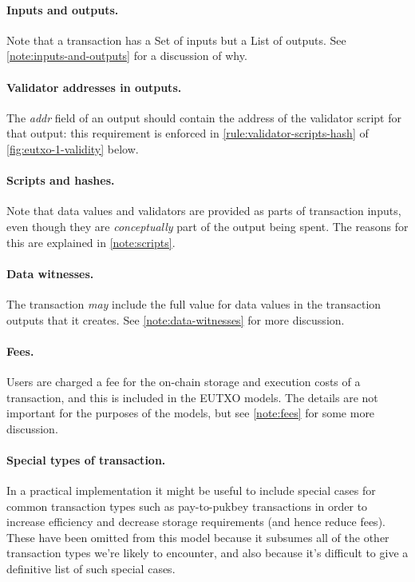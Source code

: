 \documentclass[a4paper]{article}
\newcounter{note}
\begin{document}
\paragraph{Inputs and outputs.} Note that a transaction has a
\textsf{Set} of inputs but a \textsf{List} of outputs. See
\cref{note:inputs-and-outputs} for a discussion of why.

\paragraph{Validator addresses in outputs.} The \textit{addr} field
of an output should contain the address of the validator script for
that output: this requirement is enforced in
\cref{rule:validator-scripts-hash} of
\cref{fig:eutxo-1-validity} below.

\paragraph{Scripts and hashes.} Note that data values and validators are
provided as parts of transaction inputs, even though they are
\emph{conceptually} part of the output being spent.
The reasons for this are explained in \cref{note:scripts}.

\paragraph{Data witnesses.} The transaction \emph{may} include the full
value for data values in the transaction outputs that it creates.
See \cref{note:data-witnesses} for more discussion.

\paragraph{Fees.}  Users are charged a fee for the on-chain storage
and execution costs of a transaction, and this is included in the
EUTXO models.  The details are not important for the purposes of the
models, but see \cref{note:fees} for some more discussion.

\paragraph{Special types of transaction.} In a practical
implementation it might be useful to include special cases for common
transaction types such as pay-to-pukbey transactions in order to
increase efficiency and decrease storage requirements (and hence
reduce fees).  These have been omitted from this model because it
subsumes all of the other transaction types we're likely to encounter,
and also because it's difficult to give a definitive list of such
special cases.
\end{document}
